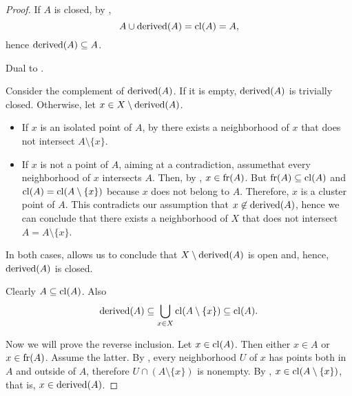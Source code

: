 \begin{proof}
  If \( A \) is closed, by ,
  \begin{equation*}
    A \cup \operatorname{derived}(A) = \operatorname{cl}(A) = A,
  \end{equation*}
  hence \( \operatorname{derived}(A) \subseteq A \).

   Dual to .

   Consider the complement of \( \operatorname{derived}(A) \). If it is empty, \( \operatorname{derived}(A) \) is trivially closed. Otherwise, let \( x \in X \setminus \operatorname{derived}(A) \).

  \begin{itemize}
    \item If \( x \) is an isolated point of \( A \), by  there exists a neighborhood of \( x \) that does not intersect \( A \setminus \{ x \} \).
    \item If \( x \) is not a point of \( A \), aiming at a contradiction, assume\LEM that every neighborhood of \( x \) intersects \( A \). Then, by , \( x \in \operatorname{fr}(A) \). But \( \operatorname{fr}(A) \subseteq \operatorname{cl}(A) \) and \( \operatorname{cl}(A) = \operatorname{cl}(A \setminus \{ x \}) \) because \( x \) does not belong to \( A \). Therefore, \( x \) is a cluster point of \( A \). This contradicts our assumption that \( x \not\in \operatorname{derived}(A) \), hence we can conclude that there exists a neighborhood of \( X \) that does not intersect \( A = A \setminus \{ x \} \).
  \end{itemize}

  In both cases,  allows us to conclude that \( X \setminus \operatorname{derived}(A) \) is open and, hence, \( \operatorname{derived}(A) \) is closed.

   Clearly \( A \subseteq \operatorname{cl}(A) \). Also
  \begin{equation*}
    \operatorname{derived}(A) \subseteq \bigcup_{x \in X} \operatorname{cl}(A \setminus \{ x \}) \subseteq \operatorname{cl}(A).
  \end{equation*}

  Now we will prove the reverse inclusion. Let \( x \in \operatorname{cl}(A) \). Then either \( x \in A \) or \( x \in \operatorname{fr}(A) \). Assume the latter. By , every neighborhood \( U \) of \( x \) has points both in \( A \) and outside of \( A \), therefore \( U \cap (A \setminus \{ x \}) \) is nonempty. By , \( x \in \operatorname{cl}(A \setminus \{ x \}) \), that is, \( x \in \operatorname{derived}(A) \).


\end{proof}
